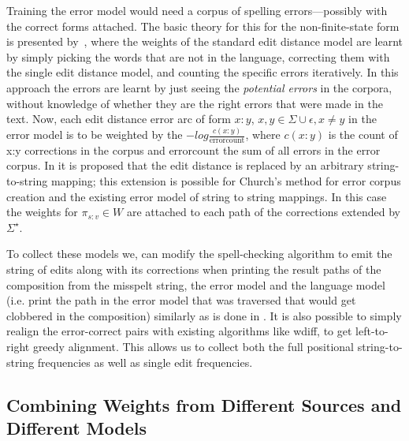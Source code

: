 \documentclass[a4paper,12pt]{article}
\begin{document}
Training the error model would need a corpus of spelling
errors---possibly with the correct forms attached. The basic theory for this
for the non-finite-state form is presented by~\cite{church1991probability},
where the weights of the standard edit distance model are learnt by simply
picking the words that are not in the language, correcting them with the single
edit distance model, and counting the specific errors iteratively. In this
approach the errors are learnt by just seeing the \emph{potential errors} in
the corpora, without knowledge of whether they are the right errors that were
made in the text. Now, each edit distance error arc of form $x:y$, $x, y \in
\Sigma \cup {\epsilon}, x \neq y$ in the error model is to be weighted by the $-log
\frac{c(x:y)}{\mathrm{error count}}$, where $c(x:y)$ is the count of x:y
corrections in the corpus and $\mathrm{error count}$ the sum of all errors in
the error corpus. In \cite{brill2000improved} it is proposed that the
edit distance is replaced by an arbitrary string-to-string mapping; this
extension is possible for Church's method for error corpus creation and
the existing error model of string to string mappings. In this case the
weights for $\pi_{s:v} \in W$ are attached to each path of the corrections
extended by $\Sigma^{\star}$.

To collect these models we, can modify the spell-checking algorithm to emit the
string of edits along with its corrections when printing the result paths of
the composition from the misspelt string, the error model and the language
model (i.e. print the path in the error model that was traversed that would get
clobbered in the composition) similarly as is done in
\cite{ristad1998learning}. It is also possible to simply realign the
error-correct pairs with existing algorithms like wdiff, to get left-to-right
greedy alignment. This allows us to collect both the full positional
string-to-string frequencies as well as single edit frequencies.

\subsection{Combining Weights from Different Sources and Different Models}
\label{subsec:combining-weights}
\end{document}

